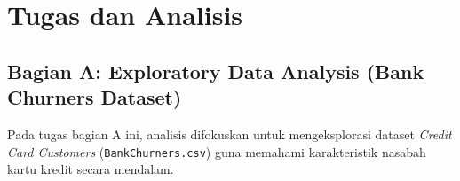 \documentclass[a4paper,oneside,12pt]{report}
\begin{document}
\clearpage

\section{Tugas dan Analisis}

\subsection{Bagian A: Exploratory Data Analysis (Bank Churners Dataset)}
Pada tugas bagian A ini, analisis difokuskan untuk mengeksplorasi dataset \textit{Credit Card Customers} (\texttt{BankChurners.csv}) guna memahami karakteristik nasabah kartu kredit secara mendalam.
\end{document}
